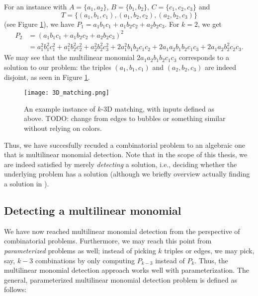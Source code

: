 For an instance with $A = \{a_1, a_2\}$, $B = \{b_1, b_2\}$, $C = \{c_1, c_2,
c_3\}$ and 
\[
  T = \{(a_1, b_1, c_1), (a_1, b_2, c_2), (a_2, b_2, c_3)\}
\]
(see Figure \ref{fig:3D_matching}), 
we have $P_1 = a_1b_1c_1 + a_1b_2c_2 + a_2b_2c_3$. For $k=2$, we get 
\begin{align*}
  P_2 &= (a_1b_1c_1 + a_1b_2c_2 + a_2b_2c_3)^2 \\
  &= a_1^2b_1^2c_1^2 + a_1^2b_2^2c_2^2 + a_2^2b_2^2c_3^2 + 
  2a_1^2b_1b_2c_1c_2 + 2a_1a_2b_1b_2c_1c_3 + 2 a_1a_2b_2^2c_2c_3.
\end{align*}
We may see that the multilinear monomial $2a_1a_2b_1b_2c_1c_3$ corresponds 
to a solution to our problem: the triples $(a_1,b_1,c_1)$ and $(a_2,b_2,c_3)$ are 
indeed disjoint, as seen in Figure \ref{fig:3D_matching}.
%
\begin{figure}[h]
  \texttt{[image: 3D\_matching.png]}
  \centering
  \caption{An example instance of $k$-3D matching, with inputs defined 
  as above. 
  TODO: change from edges to bubbles or something similar without relying on colors.}
  \label{fig:3D_matching}
\end{figure}

Thus, we have succesfully recuded a combinatorial problem to an 
algebraic one that is multilinear monomial detection. 
Note that in the scope of this thesis, we 
are indeed satisfied by merely \emph{detecting} a solution, i.e., deciding whether 
the underlying problem has a solution (although we briefly overview 
actually finding a solution in ).

\subsection{Detecting a multilinear monomial}
\label{sect:problem_definition}

We have now reached multilinear monomial detection from the perspective 
of combinatorial problems. Furthermore, we may reach this point from 
\emph{parameterized} problems as well; instead of picking $k$ triples or edges, 
we may pick, say, $k-3$ combinations by only computing $P_{k-3}$ instead of $P_k$. 
Thus, the multilinear monomial detection approach works well with parameterization. 
The general, parameterized multilinear monomial detection problem is defined as follows: 

\begin{problem}
\end{problem}

